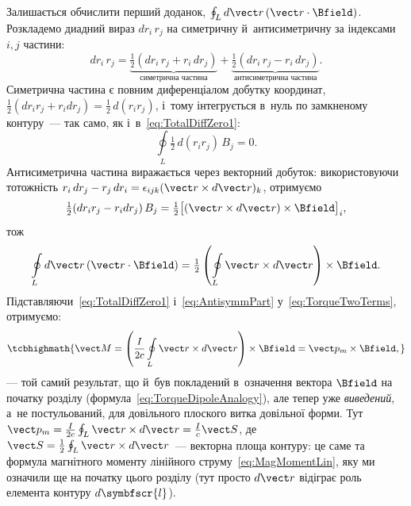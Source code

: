 Залишається обчислити перший доданок, $\oint_L d\vect r\,(\vect r\cdot\Bfield)$.
Розкладемо диадний вираз $dr_i\,r_j$ на симетричну й~антисиметричну за індексами $i,j$
частини:
\begin{equation*}
	dr_i\, r_j = \underbrace{\tfrac12(dr_i\,r_j + r_i\,dr_j)}_{\text{симетрична частина}} + \underbrace{\tfrac12(dr_i\,r_j - r_i\,dr_j)}_{\text{антисиметрична частина}}.
\end{equation*}
Симетрична частина є повним диференціалом добутку координат, $\tfrac12(dr_i r_j+r_i
	dr_j)=\tfrac12\,d(r_ir_j)$, і~тому інтегрується в~нуль по замкненому контуру~--- так само,
як і~в~\eqref{eq:TotalDiffZero1}:
\begin{equation*}
	\oint\limits_L \tfrac12\,d(r_i r_j)\,B_j = 0.
\end{equation*}
Антисиметрична частина виражається через векторний добуток: використовуючи тотожність
$r_i\,dr_j - r_j\,dr_i = \epsilon_{ijk}(\vect r\times d\vect r)_k$, отримуємо
\begin{equation*}
	\tfrac12(dr_i r_j - r_i dr_j)\,B_j = \tfrac12\bigl[(\vect r\times d\vect r)\times\Bfield\bigr]_i,
\end{equation*}
тож
%
\begin{equation}\label{eq:AntisymmPart}
	\oint\limits_L d\vect r\,(\vect r\cdot\Bfield) = \tfrac12\left(\oint\limits_L\vect r\times d\vect r\right)\times\Bfield.
\end{equation}
%
Підставляючи~\eqref{eq:TotalDiffZero1} і~\eqref{eq:AntisymmPart}
у~\eqref{eq:TorqueTwoTerms}, отримуємо:
\begin{equation}\label{eq:TorqueLoop}
	\tcbhighmath{
		\vect M = \left(\frac{I}{2c}\oint\limits_L \vect r\times d\vect r\right)\times\Bfield = \vect p_m\times\Bfield,
	}
\end{equation}
--- той самий результат, що й~був покладений в~означення вектора $\Bfield$ на початку
розділу (формула~\eqref{eq:TorqueDipoleAnalogy}), але тепер уже \emph{виведений}, а~не
постульований, для довільного плоского витка довільної форми. Тут $\vect p_m =
	\frac{I}{2c}\oint_L\vect r\times d\vect r = \frac{I}{c}\vect S$, де $\vect
	S=\frac12\oint_L\vect r\times d\vect r$~--- векторна площа контуру: це саме та формула
магнітного моменту лінійного струму~\eqref{eq:MagMomentLin}, яку ми означили ще на початку
цього розділу (тут просто $d\vect r$ відіграє роль елемента контуру $d\symbfscr{l}$).


